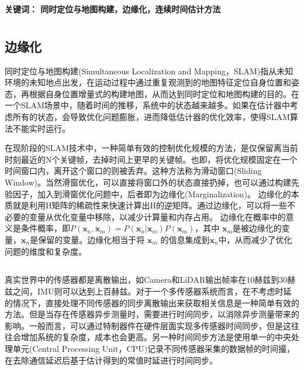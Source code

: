 \documentclass[12pt, onecolumn]{article}
\newcommand\normf{\fangsong}
\newcommand\keywords[1]{\bfseries{关键词：} \normf #1}
\begin{document}
	\noindent\keywords{同时定位与地图构建，边缘化，连续时间估计方法}
	
	\section{\normf{概述}}
	\normf\bfseries
	
	\subsection{\normf 边缘化}
	同时定位与地图构建(Simultaneous Localization and Mapping，SLAM)指从未知环境的未知地点出发，在运动过程中通过重复观测到的地图特征定位自身位置和姿态，再根据自身位置增量式的构建地图，从而达到同时定位和地图构建的目的\cite{高翔2017视觉}。在一个SLAM场景中，随着时间的推移，系统中的状态越来越多。如果在估计器中考虑所有的状态，会导致优化问题膨胀，进而降低估计器的优化效率，使得SLAM算法不能实时运行。
	
	在现阶段的SLAM技术中，一种简单有效的控制优化规模的方法，是仅保留离当前时刻最近的N个关键帧，去掉时间上更早的关键帧。也即，将优化规模固定在一个时间窗口内，离开这个窗口的则被丢弃。这种方法称为滑动窗口(Sliding Window)\cite{sibley2008sliding}。当然滑窗优化，可以直接将窗口外的状态直接扔掉，也可以通过构建先验因子，加入到滑窗优化问题中，后者即为边缘化(Marginalization)。
	边缘化的本质就是利用H矩阵的稀疏性来快速计算出H的逆矩阵。通过边缘化，可以将一些不必要的变量从优化变量中移除，以减少计算量和内存占用。
	边缘化在概率中的意义是条件概率，即$ P (\boldsymbol{x}_n, \boldsymbol{x}_m) = P (\boldsymbol{x}_n |\boldsymbol{x}_m)P (\boldsymbol{x}_m)$，其中 $\boldsymbol{x}_m$是被边缘化的变量，$\boldsymbol{x}_n$是保留的变量。边缘化相当于将 $\boldsymbol{x}_m$ 的信息集成到$\boldsymbol{x}_n$中，从而减少了优化问题的维度和复杂度。
	
	\subsection{\normf{离散时间和连续时间估计}}
	真实世界中的传感器都是离散输出，如Camera和LiDAR输出帧率在10赫兹到30赫兹之间，IMU则可以达到上百赫兹。对于一个多传感器系统而言，在不考虑时延的情况下，直接处理不同传感器的同步离散输出来获取相关信息是一种简单有效的方法。但是当存在传感器异步测量时，需要进行时间同步，以消除异步测量带来的影响。一般而言，可以通过特制器件在硬件层面实现多传感器时间同步，但是这往往会增加系统的复杂度，成本也会更高。另一种时间同步方法是使用单一的中央处理单元(Central Processing Unit，CPU)记录不同传感器采集的数据帧的时间撮，在去除通信延迟后基于估计得到的常值时延进行时间同步。
	
\end{document}
